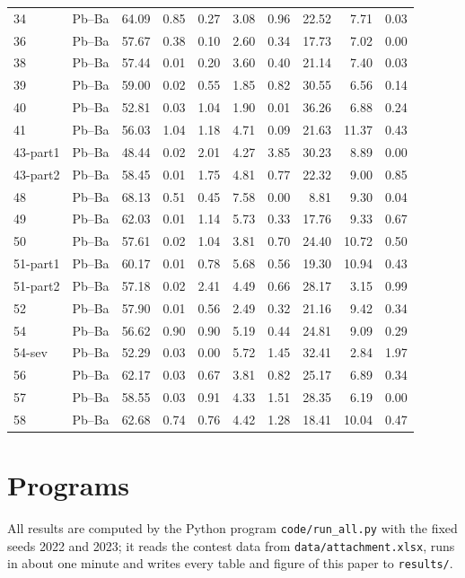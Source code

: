 \documentclass[11pt,a4paper]{article}
\begin{document}
\begin{longtable}{llrrrrrrrr}
34 & Pb--Ba & 64.09 & 0.85 & 0.27 & 3.08 & 0.96 & 22.52 & 7.71 & 0.03 \\
36 & Pb--Ba & 57.67 & 0.38 & 0.10 & 2.60 & 0.34 & 17.73 & 7.02 & 0.00 \\
38 & Pb--Ba & 57.44 & 0.01 & 0.20 & 3.60 & 0.40 & 21.14 & 7.40 & 0.03 \\
39 & Pb--Ba & 59.00 & 0.02 & 0.55 & 1.85 & 0.82 & 30.55 & 6.56 & 0.14 \\
40 & Pb--Ba & 52.81 & 0.03 & 1.04 & 1.90 & 0.01 & 36.26 & 6.88 & 0.24 \\
41 & Pb--Ba & 56.03 & 1.04 & 1.18 & 4.71 & 0.09 & 21.63 & 11.37 & 0.43 \\
43-part1 & Pb--Ba & 48.44 & 0.02 & 2.01 & 4.27 & 3.85 & 30.23 & 8.89 & 0.00 \\
43-part2 & Pb--Ba & 58.45 & 0.01 & 1.75 & 4.81 & 0.77 & 22.32 & 9.00 & 0.85 \\
48 & Pb--Ba & 68.13 & 0.51 & 0.45 & 7.58 & 0.00 & 8.81 & 9.30 & 0.04 \\
49 & Pb--Ba & 62.03 & 0.01 & 1.14 & 5.73 & 0.33 & 17.76 & 9.33 & 0.67 \\
50 & Pb--Ba & 57.61 & 0.02 & 1.04 & 3.81 & 0.70 & 24.40 & 10.72 & 0.50 \\
51-part1 & Pb--Ba & 60.17 & 0.01 & 0.78 & 5.68 & 0.56 & 19.30 & 10.94 & 0.43 \\
51-part2 & Pb--Ba & 57.18 & 0.02 & 2.41 & 4.49 & 0.66 & 28.17 & 3.15 & 0.99 \\
52 & Pb--Ba & 57.90 & 0.01 & 0.56 & 2.49 & 0.32 & 21.16 & 9.42 & 0.34 \\
54 & Pb--Ba & 56.62 & 0.90 & 0.90 & 5.19 & 0.44 & 24.81 & 9.09 & 0.29 \\
54-sev & Pb--Ba & 52.29 & 0.03 & 0.00 & 5.72 & 1.45 & 32.41 & 2.84 & 1.97 \\
56 & Pb--Ba & 62.17 & 0.03 & 0.67 & 3.81 & 0.82 & 25.17 & 6.89 & 0.34 \\
57 & Pb--Ba & 58.55 & 0.03 & 0.91 & 4.33 & 1.51 & 28.35 & 6.19 & 0.00 \\
58 & Pb--Ba & 62.68 & 0.74 & 0.76 & 4.42 & 1.28 & 18.41 & 10.04 & 0.47 \\
\end{longtable}
\endgroup

\section{Programs}
All results are computed by the Python program \texttt{code/run\_all.py} with the fixed seeds 2022 and 2023; it reads the contest data from \texttt{data/attachment.xlsx}, runs in about one minute and writes every table and figure of this paper to \texttt{results/}.
\end{document}
